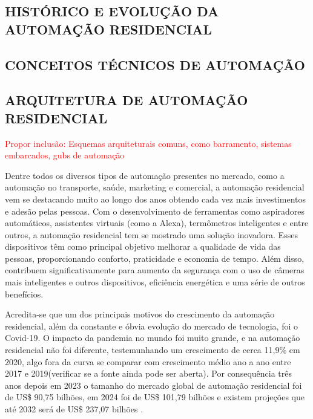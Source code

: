     

    \subsection{HISTÓRICO E EVOLUÇÃO DA AUTOMAÇÃO RESIDENCIAL}


    \subsection{CONCEITOS TÉCNICOS DE AUTOMAÇÃO}


    \subsection{ARQUITETURA DE AUTOMAÇÃO RESIDENCIAL}

        \textcolor{red}{Propor inclusão: Esquemas arquiteturais comuns, como barramento, sistemas embarcados, gubs de automação}
    
        Dentre todos os diversos tipos de automação presentes no mercado, como a automação no transporte, saúde, marketing e comercial, a automação residencial vem se destacando muito ao longo dos anos obtendo cada vez mais investimentos e adesão pelas pessoas. Com o desenvolvimento de ferramentas como aspiradores automáticos, assistentes virtuais (como a Alexa), termômetros inteligentes e entre outros, a automação residencial tem se mostrado uma solução inovadora. Esses dispositivos têm como principal objetivo melhorar a qualidade de vida das pessoas, proporcionando conforto, praticidade e economia de tempo. Além disso, contribuem significativamente para aumento da segurança com o uso de câmeras mais inteligentes e outros dispositivos, eficiência energética e uma série de outros benefícios\cite{automacaoResidencial}.

        Acredita-se que um dos principais motivos do crescimento da automação residencial, além da constante e óbvia evolução do mercado de tecnologia, foi o Covid-19. O impacto da pandemia no mundo foi muito grande, e na automação residencial não foi diferente, testemunhando um crescimento de cerca 11,9\% em 2020, algo fora da curva se comparar com crescimento médio ano a ano entre 2017 e 2019\cite{automacaoCovid}(verificar se a fonte ainda pode ser aberta). Por consequência três anos depois em 2023 o tamanho do mercado global de automação residencial foi de US\$ 90,75 bilhões, em 2024 foi de US\$ 101,79 bilhões e existem projeções que até 2032 será de US\$ 237,07 bilhões \cite{automacaoDepoisCovid}.
        
